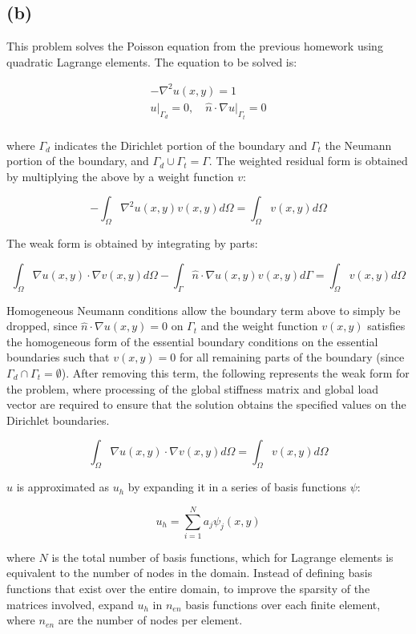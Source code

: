 \documentclass[10pt]{article}
\newcommand{\beq}{\begin{equation}}
\newcommand{\eeq}{\end{equation}}
\newcommand{\beqa}{\begin{equation}\begin{aligned}}
\newcommand{\eeqa}{\end{aligned}\end{equation}}
\begin{document}
\subsection{(b)}

This problem solves the Poisson equation from the previous homework using quadratic Lagrange elements. The equation to be solved is:

\beqa
-\nabla^2u(x,y)=1\\
u\rvert_{\Gamma_d}=0,\quad \hat{n}\cdot\nabla u\rvert_{\Gamma_t}=0\\
\eeqa

where \(\Gamma_d\) indicates the Dirichlet portion of the boundary and \(\Gamma_t\) the Neumann portion of the boundary, and \(\Gamma_d\cup\Gamma_t=\Gamma\). The weighted residual form is obtained by multiplying the above by a weight function \(v\):

\beq
-\int_\Omega \nabla^2u(x,y)v(x,y)d\Omega=\int_\Omega v(x,y)d\Omega
\eeq

The weak form is obtained by integrating by parts:

\beq
\int_\Omega \nabla u(x,y)\cdot\nabla v(x,y)d\Omega-\int_\Gamma\hat{n}\cdot\nabla u(x,y)v(x,y)d\Gamma=\int_\Omega v(x,y)d\Omega
\eeq

Homogeneous Neumann conditions allow the boundary term above to simply be dropped, since \(\hat{n}\cdot\nabla u(x,y)=0\) on \(\Gamma_t\) and the weight function \(v(x,y)\) satisfies the homogeneous form of the essential boundary conditions on the essential boundaries such that \(v(x,y)=0\) for all remaining parts of the boundary (since \(\Gamma_d\cap\Gamma_t=\emptyset\)). After removing this term, the following represents the weak form for the problem, where processing of the global stiffness matrix and global load vector are required to ensure that the solution obtains the specified values on the Dirichlet boundaries.

\beq
\int_\Omega \nabla u(x,y)\cdot\nabla v(x,y)d\Omega=\int_\Omega v(x,y)d\Omega
\eeq

\(u\) is approximated as \(u_h\) by expanding it in a series of basis functions \(\psi\):

\beq
u_h=\sum_{i=1}^{N}a_j\psi_j(x,y)
\eeq

where \(N\) is the total number of basis functions, which for Lagrange elements is equivalent to the number of nodes in the domain. Instead of defining basis functions that exist over the entire domain, to improve the sparsity of the matrices involved, expand \(u_h\) in \(n_{en}\) basis functions over each finite element, where \(n_{en}\) are the number of nodes per element. 
\end{document}
